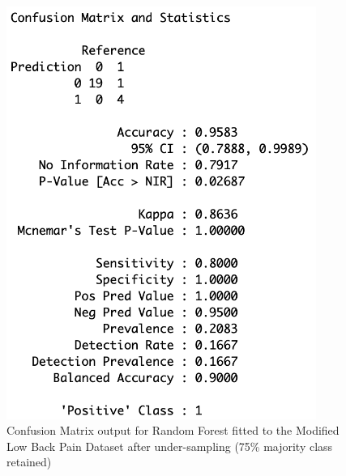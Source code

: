\begin{figure}[!htbp]
\begin{minipage}{0.45\textwidth}
        \includegraphics[width=0.9\textwidth]{ThesisTemplate/appendix/images/Chapter5Appendix/ConfusionMatrix75/ModifiedLBP.png}
        \caption{Confusion Matrix output for Random Forest fitted to the Modified Low Back Pain Dataset after under-sampling (75\% majority class retained)}
        \label{fig:my_label}
    \end{minipage}
\end{figure}

